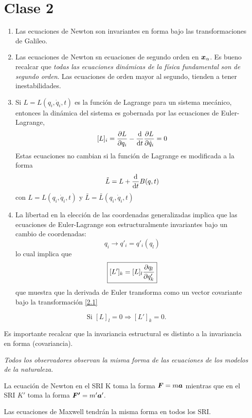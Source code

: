 \section{Clase 2}
\begin{enumerate}
	\item Las ecuaciones de Newton son invariantes en forma bajo las transformaciones de Galileo.
	\item Las ecuaciones de Newton sn ecuaciones de segundo orden en $\vb*{x}_\alpha$. Es bueno recalcar que \textit{todas las ecuaciones dinámicas de la física fundamental son de segundo orden}. Las ecuaciones de orden mayor al segundo, tienden a tener inestabilidades.
	\item Si $L=L(q_i,\dot{q}_i,t)$ es la función de Lagrange para un sistema mecánico, entonces la dinámica del sistema es gobernada por las ecuaciones de Euler-Lagrange,
	\begin{equation}\label{eqs EL}
  [L]_i=\pdv{L}{q_i}-\dv{t}\pdv{L}{\dot{q}_i}=0
\end{equation}
Estas ecuaciones no cambian si la función de Lagrange es modificada a la forma
\begin{equation}
  \tilde{L}=L+\dv{t}B(q,t)
\end{equation}
con $L=L(q_i,\dot{q}_i,t)$ y $\bar{L}=\bar{L}(q_i,\dot{q}_i,t)$
\item La libertad en la elección de las coordenadas generalizadas implica que las ecuaciones de Euler-Lagrange son estructuralmente invariantes bajo un cambio de coordenadas:
\begin{equation}\label{2.1}
  q_i\to q'_i=q'_i(q_l)
\end{equation}
lo cual implica que
\begin{equation}
  \boxed{[L']_k=[L]_l\pdv{q_l}{q'_k}}
\end{equation}
que muestra que la derivada de Euler transforma como un vector covariante bajo la transformación \ref{2.1}
\end{enumerate}
\begin{equation}
  \mbox{Si }[L]_l=0 \Rightarrow [L']_k=0.
\end{equation}

Es importante recalcar que la invariancia estructural es distinto a la invariancia en forma (covariancia).

\textit{Todos los observadores observan la misma forma de las ecuaciones de los modelos de la naturaleza.}

\begin{ej}
	La ecuación de Newton en el SRI K toma la forma $\vb*{F}=m\vb*{a}$ mientras que en el SRI $K'$ toma la forma $\vb*{F'}=m'\vb*{a}'$.
\end{ej}
\begin{ej}
	Las ecuaciones de Maxwell tendrán la misma forma en todos los SRI.
\end{ej}


